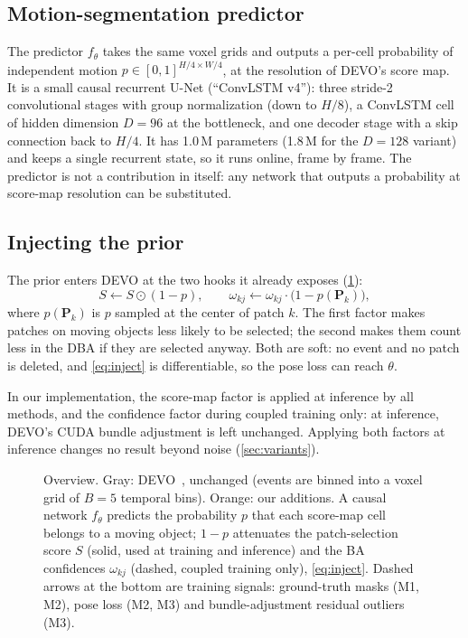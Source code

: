 \documentclass[conference]{IEEEtran}
\begin{document}
\subsection{Motion-segmentation predictor}

The predictor $f_\theta$ takes the same voxel grids and outputs a per-cell probability of
independent motion $p \in [0, 1]^{H/4 \times W/4}$, at the resolution of DEVO's score map.
It is a small causal recurrent U-Net (``ConvLSTM v4''): three stride-2 convolutional stages
with group normalization (down to $H/8$), a ConvLSTM cell of hidden dimension $D = 96$ at
the bottleneck, and one decoder stage with a skip connection back to $H/4$. It has
1.0\,M parameters (1.8\,M for the $D = 128$ variant) and keeps a single recurrent state,
so it runs online, frame by frame. The predictor is not a contribution in itself: any
network that outputs a probability at score-map resolution can be substituted.

\subsection{Injecting the prior}

The prior enters DEVO at the two hooks it already exposes (\cref{fig:arch}):
\begin{equation}
S \leftarrow S \odot (1 - p), \qquad
\omega_{kj} \leftarrow \omega_{kj} \cdot \bigl(1 - p(\mathbf{P}_k)\bigr),
\label{eq:inject}
\end{equation}
where $p(\mathbf{P}_k)$ is $p$ sampled at the center of patch $k$. The first factor makes
patches on moving objects less likely to be selected; the second makes them count less in
the DBA if they are selected anyway. Both are soft: no event and no patch is deleted, and
\cref{eq:inject} is differentiable, so the pose loss can reach $\theta$.

In our implementation, the score-map factor is applied at inference by all methods, and
the confidence factor during coupled training only: at inference, DEVO's CUDA bundle
adjustment is left unchanged. Applying both factors at inference changes no result beyond
noise (\cref{sec:variants}).

\begin{figure}[t]
\centering
\resizebox{\textwidth}{!}{}
\caption{Overview. Gray: DEVO~\cite{klenk2024devo}, unchanged (events are binned into a
voxel grid of $B = 5$ temporal bins). Orange: our additions. A causal network $f_\theta$
predicts the probability $p$ that each score-map cell belongs to a moving object; $1 - p$
attenuates the patch-selection score $S$ (solid, used at training and inference) and the
BA confidences $\omega_{kj}$ (dashed, coupled training only), \cref{eq:inject}. Dashed
arrows at the bottom are training signals: ground-truth masks (M1, M2), pose loss (M2, M3)
and bundle-adjustment residual outliers (M3).}
\label{fig:arch}
\end{figure}
\end{document}
